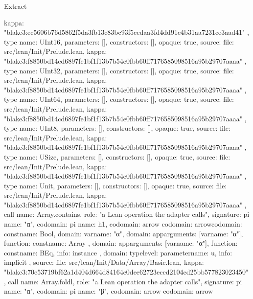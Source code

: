 \begin{lexlean}{Extract}
\begin{toolingmodule}
{{{        kappa: "blake3:ec5606b76d5862f5da3fb13c83bc93f5cedaa3fd4dd91e4b31aa7231ce3aad41"
      }
    },
    type{
      name: UInt16,
      parameters: [],
      constructors: [],
      opaque: true,
      source: {
        file: src/lean/Init/Prelude.lean,
        kappa: "blake3:f8850bd14cd6897fe1bf1f13b7b54e0fbb60ff7176585098516a95b29707aaaa"
      }
    },
    type{
      name: UInt32,
      parameters: [],
      constructors: [],
      opaque: true,
      source: {
        file: src/lean/Init/Prelude.lean,
        kappa: "blake3:f8850bd14cd6897fe1bf1f13b7b54e0fbb60ff7176585098516a95b29707aaaa"
      }
    },
    type{
      name: UInt64,
      parameters: [],
      constructors: [],
      opaque: true,
      source: {
        file: src/lean/Init/Prelude.lean,
        kappa: "blake3:f8850bd14cd6897fe1bf1f13b7b54e0fbb60ff7176585098516a95b29707aaaa"
      }
    },
    type{
      name: UInt8,
      parameters: [],
      constructors: [],
      opaque: true,
      source: {
        file: src/lean/Init/Prelude.lean,
        kappa: "blake3:f8850bd14cd6897fe1bf1f13b7b54e0fbb60ff7176585098516a95b29707aaaa"
      }
    },
    type{
      name: USize,
      parameters: [],
      constructors: [],
      opaque: true,
      source: {
        file: src/lean/Init/Prelude.lean,
        kappa: "blake3:f8850bd14cd6897fe1bf1f13b7b54e0fbb60ff7176585098516a95b29707aaaa"
      }
    },
    type{
      name: Unit,
      parameters: [],
      constructors: [],
      opaque: true,
      source: {
        file: src/lean/Init/Prelude.lean,
        kappa: "blake3:f8850bd14cd6897fe1bf1f13b7b54e0fbb60ff7176585098516a95b29707aaaa"
      }
    },
    call{
      name: Array.contains,
      role: "a Lean operation the adapter calls",
      signature: pi{
        name: "α",
        codomain: pi{
          name: h1,
          codomain: arrow{
            codomain: arrow{codomain: const{name: Bool}, domain: var{name: "α"}},
            domain: app{arguments: [var{name: "α"}], function: const{name: Array}}
          },
          domain: app{arguments: [var{name: "α"}], function: const{name: BEq}},
          info: instance
        },
        domain: type{level: parameter{name: u}},
        info: implicit
      },
      source: {
        file: src/lean/Init/Data/Array/Basic.lean,
        kappa: "blake3:70e53719bf62a1d404d664d84164e0dee62723eced2104cd25bb577823023450"
      }
    },
    call{
      name: Array.foldl,
      role: "a Lean operation the adapter calls",
      signature: pi{
        name: "α",
        codomain: pi{
          name: "β",
          codomain: arrow{
            codomain: arrow{
}}}}}}
\end{toolingmodule}
\end{lexlean}
